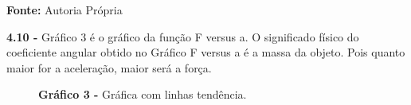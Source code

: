 \documentclass[article,12pt,oneside,a4paper,brazil]{abntex2}
\begin{document}
\begin{flushleft}
\begin{center}
\begin{table}[h!]
				\begin{adjustwidth}{0cm}{0cm}
					\begin{flushleft}
						\textbf{Fonte: }Autoria Própria
					\end{flushleft}
				\end{adjustwidth}
			\end{table}
		\end{center}
	
		\textbf{4.10 -} Gráfico 3 é o gráfico da função F versus a. O significado físico do coeficiente angular obtido no Gráfico F versus a é a massa da objeto. Pois quanto maior for a aceleração, maior será a força.
		
		\begin{center}
			\begin{figure}[h!]
				\centering
				\begin{flushleft}
					\textbf{Gráfico 3 -} Gráfica com linhas tendência.
				\end{flushleft}
				\label{fig:grafo-tabela1}
			\end{figure}
		\end{center}
	\end{flushleft}
\end{document}
